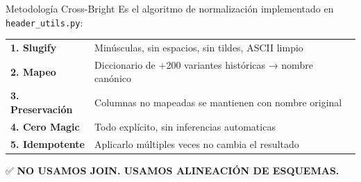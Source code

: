 \documentclass[aspectratio=169,10pt,spanish]{beamer}
\begin{document}
\begin{frame}{Metodología Cross-Bright}
Es el algoritmo de normalización implementado en \texttt{header\_utils.py}:

\vspace{0.5cm}
\begin{tabular}{@{}lp{10cm}@{}}
\textbf{1. Slugify} & Minúsculas, sin espacios, sin tildes, ASCII limpio \\
\textbf{2. Mapeo} & Diccionario de +200 variantes históricas → nombre canónico \\
\textbf{3. Preservación} & Columnas no mapeadas se mantienen con nombre original \\
\textbf{4. Cero Magic} & Todo explícito, sin inferencias automaticas \\
\textbf{5. Idempotente} & Aplicarlo múltiples veces no cambia el resultado \\
\end{tabular}

\vspace{0.5cm}
\begin{block}{}
\centering \Large ✅ \textbf{NO USAMOS JOIN. USAMOS ALINEACIÓN DE ESQUEMAS.}
\end{block}
\end{frame}
\end{document}
